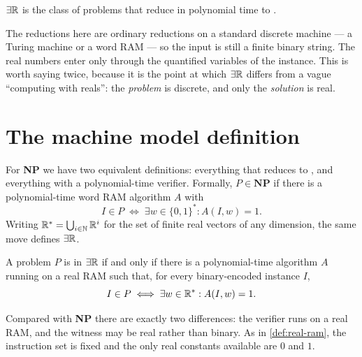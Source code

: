 \begin{definition}\label{def:er-logic}
$\exists\mathbb{R}$ is the class of problems that reduce in polynomial time to \ETR{}.
\end{definition}

The reductions here are ordinary reductions on a standard discrete machine --- a
Turing machine or a word RAM --- so the input is still a finite binary string.
The real numbers enter only through the quantified variables of the \ETR{}
instance. This is worth saying twice, because it is the point at which $\exists\mathbb{R}$
differs from a vague ``computing with reals'': the \emph{problem} is discrete,
and only the \emph{solution} is real.

\section{The machine model definition}
\label{sec:er-class}

For \textbf{NP} we have two equivalent definitions: everything that reduces to
, and everything with a polynomial-time verifier. Formally,
$P \in \textbf{NP}$ if there is a polynomial-time word RAM algorithm $A$ with
\[ I \in P \;\Longleftrightarrow\; \exists w \in \{0,1\}^{*} : A(I,w) = 1. \]
Writing $\mathbb{R}^{*} = \bigcup_{i \in \mathbb{N}} \mathbb{R}^i$ for the set of finite real vectors of
any dimension, the same move defines $\exists\mathbb{R}$.

\begin{theorem}\label{thm:er-machine-model}
A problem $P$ is in $\exists\mathbb{R}$ if and only if there is a polynomial-time algorithm
$A$ running on a real RAM such that, for every binary-encoded instance $I$,
\[ I \in P \;\Longleftrightarrow\;
   \exists w \in \mathbb{R}^{*} : A(I,w) = 1. \]
\end{theorem}

Compared with \textbf{NP} there are exactly two differences: the verifier runs
on a real RAM, and the witness may be real rather than binary. As in
\cref{def:real-ram}, the instruction set is fixed and the only real constants
available are $0$ and $1$.

